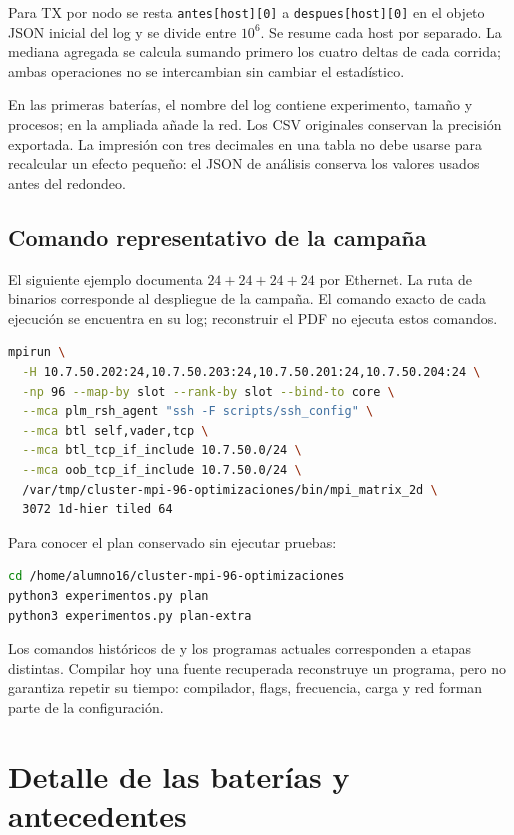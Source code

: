 Para TX por nodo se resta \texttt{antes[host][0]} a \texttt{despues[host][0]} en el objeto JSON inicial del log y se divide entre $10^6$. Se resume cada host por separado. La mediana agregada se calcula sumando primero los cuatro deltas de cada corrida; ambas operaciones no se intercambian sin cambiar el estadístico.

En las primeras baterías, el nombre del log contiene experimento, tamaño y procesos; en la ampliada añade la red. Los CSV originales conservan la precisión exportada. La impresión con tres decimales en una tabla no debe usarse para recalcular un efecto pequeño: el JSON de análisis conserva los valores usados antes del redondeo.

\subsection{Comando representativo de la campaña}

El siguiente ejemplo documenta $24+24+24+24$ por Ethernet. La ruta de binarios corresponde al despliegue de la campaña. El comando exacto de cada ejecución se encuentra en su log; reconstruir el PDF no ejecuta estos comandos.

\begin{lstlisting}[language=bash]
mpirun \
  -H 10.7.50.202:24,10.7.50.203:24,10.7.50.201:24,10.7.50.204:24 \
  -np 96 --map-by slot --rank-by slot --bind-to core \
  --mca plm_rsh_agent "ssh -F scripts/ssh_config" \
  --mca btl self,vader,tcp \
  --mca btl_tcp_if_include 10.7.50.0/24 \
  --mca oob_tcp_if_include 10.7.50.0/24 \
  /var/tmp/cluster-mpi-96-optimizaciones/bin/mpi_matrix_2d \
  3072 1d-hier tiled 64
\end{lstlisting}

Para conocer el plan conservado sin ejecutar pruebas:
\begin{lstlisting}[language=bash]
cd /home/alumno16/cluster-mpi-96-optimizaciones
python3 experimentos.py plan
python3 experimentos.py plan-extra
\end{lstlisting}
Los comandos históricos de  y los programas actuales corresponden a etapas distintas. Compilar hoy una fuente recuperada reconstruye un programa, pero no garantiza repetir su tiempo: compilador, flags, frecuencia, carga y red forman parte de la configuración.

\section{Detalle de las baterías y antecedentes}

